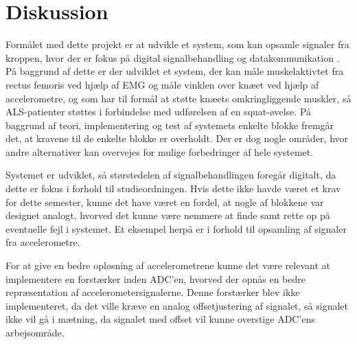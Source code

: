 \section{Diskussion}
Formålet med dette projekt er at udvikle et system, som kan opsamle signaler fra kroppen, hvor der er fokus på digital signalbehandling og datakommunikation \citep{aalborguniversitet2014}. På baggrund af dette er der udviklet et system, der kan måle muskelaktivtet fra rectus femoris ved hjælp af EMG og måle vinklen over knæet ved hjælp af accelerometre, og som har til formål at støtte knæets omkringliggende muskler, så ALS-patienter støttes i forbindelse med udførelsen af en squat-øvelse. På baggrund af teori, implementering og test af systemets enkelte blokke fremgår det, at kravene til de enkelte blokke er overholdt. Der er dog nogle områder, hvor andre alternativer kan overvejes for mulige forbedringer af hele systemet. 

Systemet er udviklet, så størstedelen af signalbehandlingen foregår digitalt, da dette er fokus i forhold til studieordningen. Hvis dette ikke havde været et krav for dette semester, kunne det have været en fordel, at nogle af blokkene var designet analogt, hvorved det kunne være nemmere at finde samt rette op på eventuelle fejl i systemet. Et eksempel herpå er i forhold til opsamling af signaler fra accelerometre. 

For at give en bedre opløsning af accelerometrene kunne det være relevant at implementere en forstærker inden ADC'en, hvorved der opnås en bedre repræsentation af accelerometersignalerne. Denne forstærker blev ikke implementeret, da det ville kræve en analog offsetjustering af signalet, så signalet ikke vil gå i mætning, da signalet med offset vil kunne overstige ADC'ens arbejsområde. %


